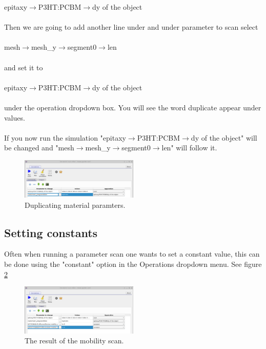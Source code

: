 epitaxy$\rightarrow$P3HT:PCBM$\rightarrow$dy of the object
\\
\\
Then we are going to add another line under and under parameter to scan select
\\
\\
mesh$\rightarrow$mesh\_y$\rightarrow$segment0$\rightarrow$len
\\
\\
and set it to
\\
\\
epitaxy$\rightarrow$P3HT:PCBM$\rightarrow$dy of the object
\\
\\
under the operation dropdown box. You will see the word duplicate appear under values.
\\
\\
If you now run the simulation "epitaxy$\rightarrow$P3HT:PCBM$\rightarrow$dy of the object" will be changed and "mesh$\rightarrow$mesh\_y$\rightarrow$segment0$\rightarrow$len" will follow it.


\begin{figure}[H]
\centering
\includegraphics[width=0.5\textwidth]{./images/param_scan_duplicate.png}
\caption{Duplicating material paramters.}
\label{fig:scanduplicate}
\end{figure}

\subsection{Setting constants}
Often when running a parameter scan one wants to set a constant value, this can be done using the "constant" option in the Operations dropdown menu. See figure \ref{fig:scanconst}

\begin{figure}[H]
\centering
\includegraphics[width=0.5\textwidth]{./images/param_scan_const.png}
\caption{The result of the mobility scan.}
\label{fig:scanconst}
\end{figure}

